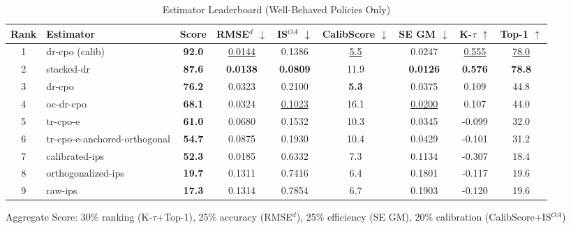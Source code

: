 \begin{table}[htbp]
\centering
\caption{Estimator Leaderboard (Well-Behaved Policies Only)}
\label{tab:leaderboard}
\begin{tabular}{cl|c|cccccc}
\toprule
Rank & Estimator & Score & RMSE$^d$ $\downarrow$ & IS$^{OA}$ $\downarrow$ & CalibScore $\downarrow$ & SE GM $\downarrow$ & K-$\tau$ $\uparrow$ & Top-1 $\uparrow$ \\
\midrule
1 & dr-cpo (calib) & \textbf{92.0} & \underline{0.0144} & 0.1386 & \underline{5.5} & 0.0247 & \underline{0.555} & \underline{78.0} \\
2 & stacked-dr & \textbf{87.6} & \textbf{0.0138} & \textbf{0.0809} & 11.9 & \textbf{0.0126} & \textbf{0.576} & \textbf{78.8} \\
3 & dr-cpo & \textbf{76.2} & 0.0323 & 0.2100 & \textbf{5.3} & 0.0375 & 0.109 & 44.8 \\
4 & oc-dr-cpo & \textbf{68.1} & 0.0324 & \underline{0.1023} & 16.1 & \underline{0.0200} & 0.107 & 44.0 \\
5 & tr-cpo-e & \textbf{61.0} & 0.0680 & 0.1532 & 10.3 & 0.0345 & -0.099 & 32.0 \\
6 & tr-cpo-e-anchored-orthogonal & \textbf{54.7} & 0.0875 & 0.1930 & 10.4 & 0.0429 & -0.101 & 31.2 \\
7 & calibrated-ips & \textbf{52.3} & 0.0185 & 0.6332 & 7.3 & 0.1134 & -0.307 & 18.4 \\
8 & orthogonalized-ips & \textbf{19.7} & 0.1311 & 0.7416 & 6.4 & 0.1801 & -0.117 & 19.6 \\
9 & raw-ips & \textbf{17.3} & 0.1314 & 0.7854 & 6.7 & 0.1903 & -0.120 & 19.6 \\
\bottomrule
\end{tabular}
\footnotesize{Aggregate Score: 30\% ranking (K-$\tau$+Top-1), 25\% accuracy (RMSE$^d$), 25\% efficiency (SE GM), 20\% calibration (CalibScore+IS$^{OA}$)}
\end{table}
